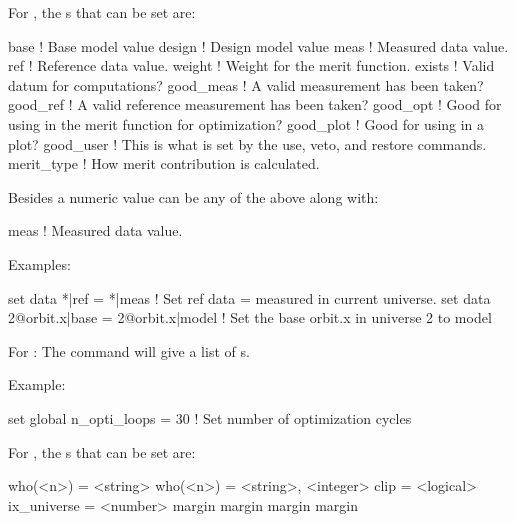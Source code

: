 {{{\begin{description}
For , the s that can be set are:
\begin{example}
  base        ! Base model value
  design      ! Design model value
  meas        ! Measured data value.
  ref         ! Reference data value.
  weight      ! Weight for the merit function.
  exists      ! Valid datum for computations?
  good_meas   ! A valid measurement has been taken?
  good_ref    ! A valid reference measurement has been taken?
  good_opt    ! Good for using in the merit function for optimization?
  good_plot   ! Good for using in a plot?
  good_user   ! This is what is set by the use, veto, and restore commands.
  merit_type  ! How merit contribution is calculated.
\end{example}
Besides a numeric value  can be any of the above along with:
\begin{example}
  meas        ! Measured data value.
\end{example}

Examples:
\begin{example}
  set data *|ref = *|meas       ! Set ref data = measured in current universe.
  set data 2@orbit.x|base = 2@orbit.x|model 
                                ! Set the base orbit.x in universe 2 to model
\end{example}


  \item[set global <component> = <value>] \Newline

For : The  command will give a list of 
s.

Example:
\begin{example}
  set global n_opti_loops = 30  ! Set number of optimization cycles
\end{example}


  \item[set graph <graph> <component> = <value>] \Newline

For , the s that can be set are:
\begin{example}
  who(<n>)    = <string>
  who(<n>)    = <string>, <integer>
  clip        = <logical>
  ix_universe = <number>
  margin%
  margin%
  margin%
  margin%
\end{example}


\end{description}}}}

